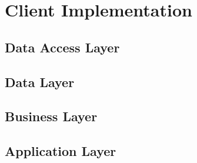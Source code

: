 \section{Client Implementation}
\subsection{Data Access Layer}
\subsection{Data Layer}
\subsection{Business Layer}
\subsection{Application Layer}

